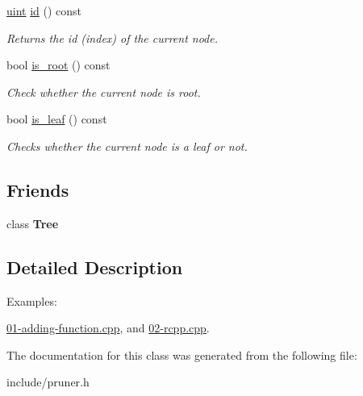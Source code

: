 \begin{DoxyCompactItemize}
\item 
\hyperlink{namespacepruner_a659e6e64a9e2b8e981c3d34262a2f67e}{uint} \hyperlink{classpruner_1_1TreeIterator_ae76ec4f2c1390d72889f78a51d65d19c}{id} () const \hypertarget{classpruner_1_1TreeIterator_ae76ec4f2c1390d72889f78a51d65d19c}{}\label{classpruner_1_1TreeIterator_ae76ec4f2c1390d72889f78a51d65d19c}

\begin{DoxyCompactList}\small\item\em Returns the id (index) of the current node. \end{DoxyCompactList}\item 
bool \hyperlink{classpruner_1_1TreeIterator_a641055ff6b66b09cc6b4826e3b826b28}{is\+\_\+root} () const \hypertarget{classpruner_1_1TreeIterator_a641055ff6b66b09cc6b4826e3b826b28}{}\label{classpruner_1_1TreeIterator_a641055ff6b66b09cc6b4826e3b826b28}

\begin{DoxyCompactList}\small\item\em Check whether the current node is root. \end{DoxyCompactList}\item 
bool \hyperlink{classpruner_1_1TreeIterator_a42538b1bf741b30d6bda489f1944d033}{is\+\_\+leaf} () const \hypertarget{classpruner_1_1TreeIterator_a42538b1bf741b30d6bda489f1944d033}{}\label{classpruner_1_1TreeIterator_a42538b1bf741b30d6bda489f1944d033}

\begin{DoxyCompactList}\small\item\em Checks whether the current node is a leaf or not. \end{DoxyCompactList}\end{DoxyCompactItemize}
\subsection*{Friends}
\begin{DoxyCompactItemize}
\item 
class {\bfseries Tree}\hypertarget{classpruner_1_1TreeIterator_a4b682814d14447120dd184fd300deade}{}\label{classpruner_1_1TreeIterator_a4b682814d14447120dd184fd300deade}

\end{DoxyCompactItemize}


\subsection{Detailed Description}
\begin{Desc}
\item[Examples\+: ]\par
\hyperlink{01-adding-function_8cpp-example}{01-\/adding-\/function.\+cpp}, and \hyperlink{02-rcpp_8cpp-example}{02-\/rcpp.\+cpp}.\end{Desc}


The documentation for this class was generated from the following file\+:\begin{DoxyCompactItemize}
\item 
include/pruner.\+h\end{DoxyCompactItemize}
